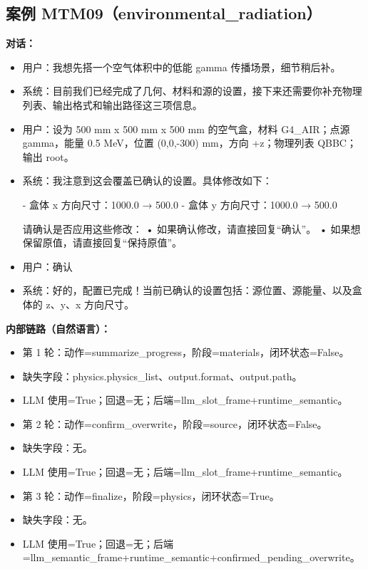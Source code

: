 \documentclass[11pt]{ctexart}
\begin{document}
\subsection{案例 MTM09（environmental\_radiation）}
\textbf{对话：}
\begin{itemize}
\item 用户：我想先搭一个空气体积中的低能 gamma 传播场景，细节稍后补。
\item 系统：目前我们已经完成了几何、材料和源的设置，接下来还需要你补充物理列表、输出格式和输出路径这三项信息。
\item 用户：设为 500 mm x 500 mm x 500 mm 的空气盒，材料 G4\_AIR；点源 gamma，能量 0.5 MeV，位置 (0,0,-300) mm，方向 +z；物理列表 QBBC；输出 root。
\item 系统：我注意到这会覆盖已确认的设置。具体修改如下：

- 盒体 x 方向尺寸：1000.0 → 500.0
- 盒体 y 方向尺寸：1000.0 → 500.0

请确认是否应用这些修改：
• 如果确认修改，请直接回复“确认”。
• 如果想保留原值，请直接回复“保持原值”。
\item 用户：确认
\item 系统：好的，配置已完成！当前已确认的设置包括：源位置、源能量、以及盒体的 z、y、x 方向尺寸。
\end{itemize}
\textbf{内部链路（自然语言）：}
\begin{itemize}
\item 第 1 轮：动作=summarize\_progress，阶段=materials，闭环状态=False。
\item 缺失字段：physics.physics\_list、output.format、output.path。
\item LLM 使用=True；回退=无；后端=llm\_slot\_frame+runtime\_semantic。
\item 第 2 轮：动作=confirm\_overwrite，阶段=source，闭环状态=False。
\item 缺失字段：无。
\item LLM 使用=True；回退=无；后端=llm\_slot\_frame+runtime\_semantic。
\item 第 3 轮：动作=finalize，阶段=physics，闭环状态=True。
\item 缺失字段：无。
\item LLM 使用=True；回退=无；后端=llm\_semantic\_frame+runtime\_semantic+confirmed\_pending\_overwrite。
\end{itemize}
\end{document}
